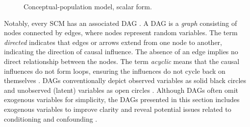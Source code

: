 \documentclass[
  authoryear,
  review,
  1p]{elsarticle}
\begin{document}
\begin{figure}[H]

\begin{minipage}{\linewidth}

\centering{

\[
\begin{aligned}
  O^{cp}_{hiabjk} & := f_{O}(D_{hiabjk}) \\
  D_{hiabjk} & := f_{D}(T_{ha}, T_{ib}, B_{jk})
\end{aligned}
\]

}


\end{minipage}%
\newline
\begin{minipage}{\linewidth}



\end{minipage}%

\caption{\label{fig-cj03}Conceptual-population model, scalar form.}

\end{figure}%

Notably, every SCM has an associated DAG
\citep{Pearl_et_al_2016, Cinelli_et_al_2020}. A DAG is a \emph{graph}
consisting of nodes connected by edges, where nodes represent random
variables. The term \emph{directed} indicates that edges or arrows
extend from one node to another, indicating the direction of causal
influence. The absence of an edge implies no direct relationship between
the nodes. The term \emph{acyclic} means that the causal influences do
not form loops, ensuring the influences do not cycle back on themselves
\citep{McElreath_2020}. DAGs conventionally depict observed variables as
solid black circles and unobserved (latent) variables as open circles
\citep{Morgan_et_al_2014}. Although DAGs often omit exogenous variables
for simplicity, the DAGs presented in this section includes exogenous
variables to improve clarity and reveal potential issues related to
conditioning and confounding \citep{Cinelli_et_al_2020}.
\end{document}
